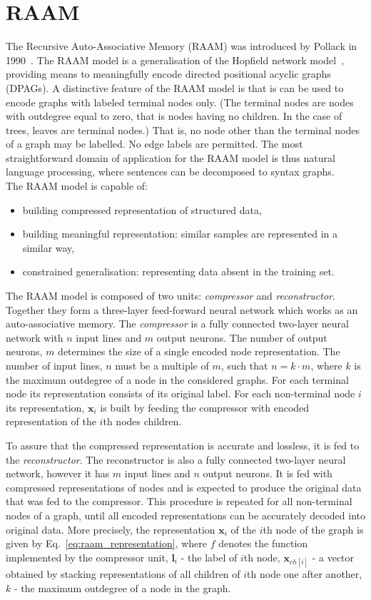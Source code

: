 \section{RAAM}
The Recursive Auto-Associative Memory (RAAM) was introduced by Pollack in 1990~\cite{pollack1990recursive}. The RAAM model is a generalisation of the Hopfield network model~\cite{goulon2005hopfield}, providing means to meaningfully encode directed positional acyclic graphs (DPAGs). A distinctive feature of the RAAM model is that is can be used to encode graphs with labeled terminal nodes only. (The terminal nodes are nodes with outdegree equal to zero, that is nodes having no children. In the case of trees, leaves are terminal nodes.) That is, no node other than the terminal nodes of a graph may be labelled. No edge labels are permitted. The most straightforward domain of application for the RAAM model is thus natural language processing, where sentences can be decomposed to syntax graphs.\\
\noindent The RAAM model is capable of:
\begin{itemize}
	\item building compressed representation of structured data,
	\item building meaningful representation: similar samples are represented in a similar way,
	\item constrained generalisation: representing data absent in the training set.
\end{itemize}
The RAAM model is composed of two units: \emph{compressor} and \emph{reconstructor}. Together they form a three-layer feed-forward neural network which works as an auto-associative memory. The \emph{compressor} is a fully connected two-layer neural network with $n$ input lines and $m$ output neurons. The number of output neurons, $m$ determines the size of a single encoded node representation. The number of input lines, $n$ must be a multiple of $m$, such that $n = k \cdot m$, where $k$ is the maximum outdegree of a node in the considered graphs. For each terminal node its representation consists of its original label. For each non-terminal node $i$ its representation, $\bm{x}_i$ is built by feeding the compressor with encoded representation of the $i$th nodes children.

To assure that the compressed representation is accurate and lossless, it is fed to the \emph{reconstructor}. The reconstructor is also a fully connected two-layer neural network, however it has $m$ input lines and $n$ output neurons. It is fed with compressed representations of nodes and is expected to produce the original data that was fed to the compressor. This procedure is repeated for all non-terminal nodes of a graph, until all encoded representations can be accurately decoded into original data. More precisely, the representation $\bm{x}_i$ of the $i$th node of the graph is given by Eq.~\ref{eq:raam_representation}, where $f$ denotes the function implemented by the compressor unit, $\bm{l}_i$ - the label of $i$th node, $\bm{x}_{ch[i]}$ - a vector obtained by stacking representations of all children of $i$th node one after another, $k$ - the maximum outdegree of a node in the graph.

